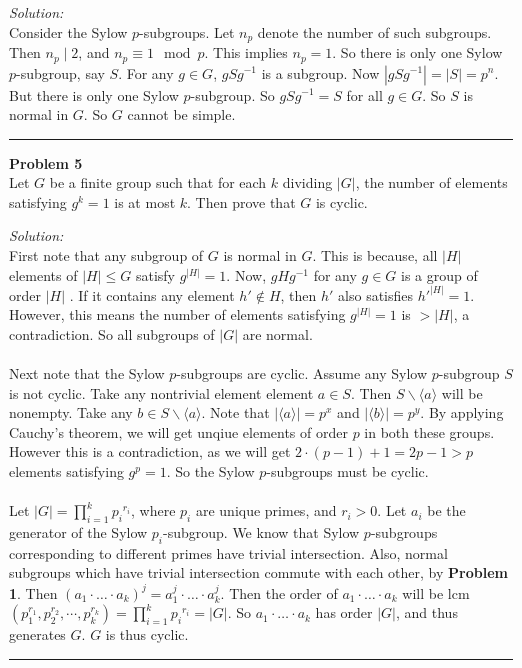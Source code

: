 \documentclass[a4paper, 11pt]{article}
\newenvironment{problem}[2][Problem]
    { \begin{mdframed}[backgroundcolor=gray!20] \textbf{#1 #2} \\}
    {  \end{mdframed}}
\newenvironment{solution}
    {\textit{Solution:}}
    {}
\begin{document}
\begin{solution}\\
    Consider the Sylow $p$-subgroups.
    Let $n_p$ denote the number of such subgroups.
    Then $n_p \mid 2$, and $n_p \equiv 1 \mod{p}$.
    This implies $n_p = 1$.
    So there is only one Sylow $p$-subgroup, say $S$.
    For any $g \in G$, $g S g^{-1}$ is a subgroup.
    Now $|g S g^{-1}| = |S| = p^n$.
    But there is only one Sylow $p$-subgroup.
    So $g S g^{-1} = S$ for all $g \in G$.
    So $S$ is normal in $G$.
    So $G$ cannot be simple.
\end{solution}

\noindent\rule{7in}{2.8pt}


\begin{problem}{5}
    Let $G$ be a finite group such that for each $k$ dividing $|G|$, the number of elements satisfying $g^k = 1$ is at most $k$.
    Then prove that $G$ is cyclic.
\end{problem}

\begin{solution}\\
    First note that any subgroup of $G$ is normal in $G$.
    This is because, all $|H|$ elements of $|H| \leq G$ satisfy $g^{|H|} = 1$.
    Now, $g H g^{-1}$ for any $g \in G$ is a group of order $|H|$ .
    If it contains any element $h' \notin H$, then $h'$ also satisfies $h'^{|H|} = 1$.
    However, this means the number of elements satisfying $g^{|H|} = 1$ is $> |H|$, a contradiction.
    So all subgroups of $|G|$ are normal.\\\\
    Next note that the Sylow $p$-subgroups are cyclic.
    Assume any Sylow $p$-subgroup $S$ is not cyclic.
    Take any nontrivial element element $a \in S$.
    Then $S \backslash \langle a \rangle$ will be nonempty.
    Take any $b \in S \backslash \langle a \rangle$.
    Note that $| \langle a \rangle | = p^x$ and $| \langle b \rangle | = p^y$.
    By applying Cauchy's theorem, we will get unqiue elements of order $p$ in both these groups.
    However this is a contradiction, as we will get $2 \cdot (p - 1) + 1 = 2p - 1 > p$ elements satisfying $g^p = 1$.
    So the Sylow $p$-subgroups must be cyclic.\\\\
    Let $|G| = \prod_{i = 1}^{k} {p_i}^{r_i}$, where $p_i$ are unique primes, and $r_i > 0$.
    Let $a_i$ be the generator of the Sylow $p_i$-subgroup.
    We know that Sylow $p$-subgroups corresponding to different primes have trivial intersection.
    Also, normal subgroups which have trivial intersection commute with each other, by \textbf{Problem 1}.
    Then $(a_1 \cdot \ldots \cdot a_k)^j = a_1^j \cdot \ldots \cdot a_k^j$.
    Then the order of $a_1 \cdot \ldots \cdot a_k$ will be lcm$(p_1^{r_1}, p_2^{r_2}, \cdots, p_k^{r_k}) = \prod_{i = 1}^{k} {p_i}^{r_i} = |G|$.
    So $a_1 \cdot \ldots \cdot a_k$ has order $|G|$, and thus generates $G$.
    $G$ is thus cyclic.
\end{solution} 

\noindent\rule{7in}{2.8pt}

\end{document}
